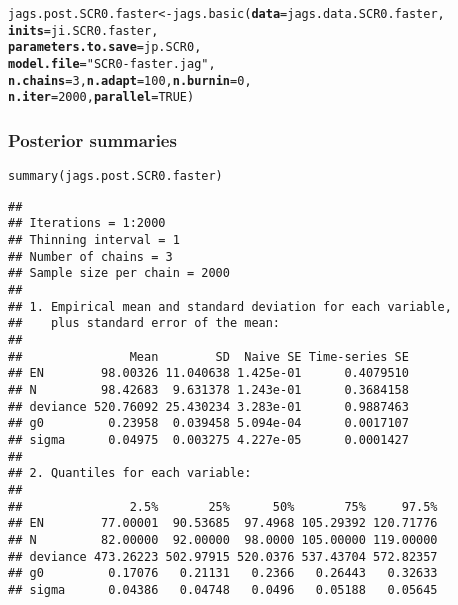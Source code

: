 \documentclass[color=usenames,dvipsnames]{beamer}\usepackage[]{graphicx}\usepackage[]{color}
\makeatletter
\newcommand{\hlnum}[1]{\textcolor[rgb]{0.69,0.494,0}{#1}}%
\newcommand{\hlstr}[1]{\textcolor[rgb]{0.749,0.012,0.012}{#1}}%
\newcommand{\hlstd}[1]{\textcolor[rgb]{0,0,0}{#1}}%
\newcommand{\hlkwb}[1]{\textcolor[rgb]{0,0.341,0.682}{#1}}%
\newcommand{\hlkwc}[1]{\textcolor[rgb]{0,0,0}{\textbf{#1}}}%
\newcommand{\hlkwd}[1]{\textcolor[rgb]{0.004,0.004,0.506}{#1}}%
\newenvironment{kframe}{%
 \def\at@end@of@kframe{}%
 \ifinner\ifhmode%
  \def\at@end@of@kframe{\end{minipage}}%
  \begin{minipage}{\columnwidth}%
 \fi\fi%
 \def\FrameCommand##1{\hskip\@totalleftmargin \hskip-\fboxsep
 \colorbox{shadecolor}{##1}\hskip-\fboxsep
     \hskip-\linewidth \hskip-\@totalleftmargin \hskip\columnwidth}%
 \MakeFramed {\advance\hsize-\width
   \@totalleftmargin\z@ \linewidth\hsize
   \@setminipage}}%
 {\par\unskip\endMakeFramed%
 \at@end@of@kframe}
\newenvironment{knitrout}{}{} %
\makeatother
\begin{document}
\begin{frame}[fragile]
\begin{knitrout}
\begin{kframe}
\begin{alltt}
\hlstd{jags.post.SCR0.faster} \hlkwb{<-} \hlkwd{jags.basic}\hlstd{(}\hlkwc{data}\hlstd{=jags.data.SCR0.faster,}
                                    \hlkwc{inits}\hlstd{=ji.SCR0.faster,}
                                    \hlkwc{parameters.to.save}\hlstd{=jp.SCR0,}
                                    \hlkwc{model.file}\hlstd{=}\hlstr{"SCR0-faster.jag"}\hlstd{,}
                                    \hlkwc{n.chains}\hlstd{=}\hlnum{3}\hlstd{,} \hlkwc{n.adapt}\hlstd{=}\hlnum{100}\hlstd{,} \hlkwc{n.burnin}\hlstd{=}\hlnum{0}\hlstd{,}
                                    \hlkwc{n.iter}\hlstd{=}\hlnum{2000}\hlstd{,} \hlkwc{parallel}\hlstd{=}\hlnum{TRUE}\hlstd{)}
\end{alltt}
\end{kframe}
\end{knitrout}
\end{frame}




\begin{frame}[fragile]
  \frametitle{Posterior summaries}
\begin{knitrout}\tiny
{}\color{fgcolor}\begin{kframe}
\begin{alltt}
\hlkwd{summary}\hlstd{(jags.post.SCR0.faster)}
\end{alltt}
\begin{verbatim}
## 
## Iterations = 1:2000
## Thinning interval = 1 
## Number of chains = 3 
## Sample size per chain = 2000 
## 
## 1. Empirical mean and standard deviation for each variable,
##    plus standard error of the mean:
## 
##               Mean        SD  Naive SE Time-series SE
## EN        98.00326 11.040638 1.425e-01      0.4079510
## N         98.42683  9.631378 1.243e-01      0.3684158
## deviance 520.76092 25.430234 3.283e-01      0.9887463
## g0         0.23958  0.039458 5.094e-04      0.0017107
## sigma      0.04975  0.003275 4.227e-05      0.0001427
## 
## 2. Quantiles for each variable:
## 
##               2.5%       25%      50%       75%     97.5%
## EN        77.00001  90.53685  97.4968 105.29392 120.71776
## N         82.00000  92.00000  98.0000 105.00000 119.00000
## deviance 473.26223 502.97915 520.0376 537.43704 572.82357
## g0         0.17076   0.21131   0.2366   0.26443   0.32633
## sigma      0.04386   0.04748   0.0496   0.05188   0.05645
\end{verbatim}
\end{kframe}
\end{knitrout}
\end{frame}
\end{document}
